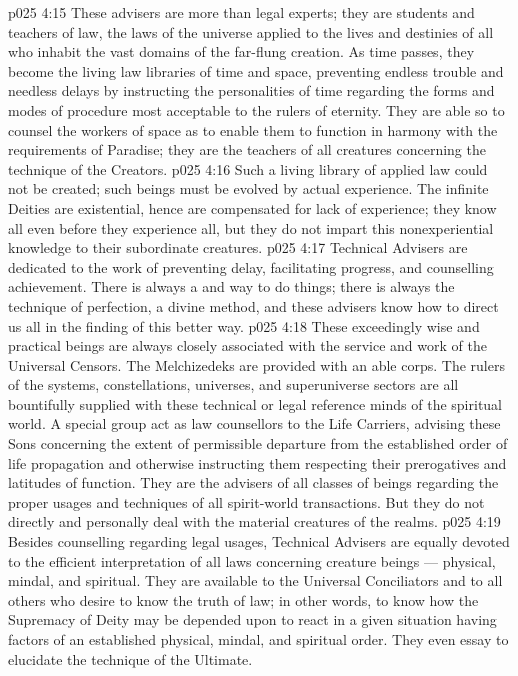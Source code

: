 \vs p025 4:15 These advisers are more than legal experts; they are students and teachers of  law, the laws of the universe applied to the lives and destinies of all who inhabit the vast domains of the far\hyp{}flung creation. As time passes, they become the living law libraries of time and space, preventing endless trouble and needless delays by instructing the personalities of time regarding the forms and modes of procedure most acceptable to the rulers of eternity. They are able so to counsel the workers of space as to enable them to function in harmony with the requirements of Paradise; they are the teachers of all creatures concerning the technique of the Creators.
\vs p025 4:16 Such a living library of applied law could not be created; such beings must be evolved by actual experience. The infinite Deities are existential, hence are compensated for lack of experience; they know all even before they experience all, but they do not impart this nonexperiential knowledge to their subordinate creatures.
\vs p025 4:17 \pc Technical Advisers are dedicated to the work of preventing delay, facilitating progress, and counselling achievement. There is always a  and  way to do things; there is always the technique of perfection, a divine method, and these advisers know how to direct us all in the finding of this better way.
\vs p025 4:18 These exceedingly wise and practical beings are always closely associated with the service and work of the Universal Censors. The Melchizedeks are provided with an able corps. The rulers of the systems, constellations, universes, and superuniverse sectors are all bountifully supplied with these technical or legal reference minds of the spiritual world. A special group act as law counsellors to the Life Carriers, advising these Sons concerning the extent of permissible departure from the established order of life propagation and otherwise instructing them respecting their prerogatives and latitudes of function. They are the advisers of all classes of beings regarding the proper usages and techniques of all spirit\hyp{}world transactions. But they do not directly and personally deal with the material creatures of the realms.
\vs p025 4:19 Besides counselling regarding legal usages, Technical Advisers are equally devoted to the efficient interpretation of all laws concerning creature beings --- physical, mindal, and spiritual. They are available to the Universal Conciliators and to all others who desire to know the truth of law; in other words, to know how the Supremacy of Deity may be depended upon to react in a given situation having factors of an established physical, mindal, and spiritual order. They even essay to elucidate the technique of the Ultimate.
